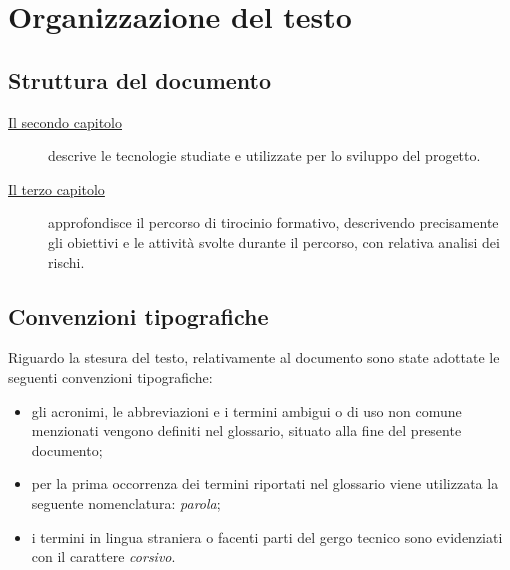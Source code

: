 \section{Organizzazione del testo}

\subsection{Struttura del documento}

\begin{description}
    \item[{\hyperref[cap:tecnologie]{Il secondo capitolo}}] descrive le tecnologie studiate e utilizzate per lo sviluppo del progetto.
    
    \item[{\hyperref[cap:descrizione-stage]{Il terzo capitolo}}] approfondisce il percorso di tirocinio formativo, descrivendo precisamente gli obiettivi e le attività svolte durante il percorso,
    con relativa analisi dei rischi.
    
\end{description}

\subsection{Convenzioni tipografiche}
Riguardo la stesura del testo, relativamente al documento sono state adottate le seguenti convenzioni tipografiche:
\begin{itemize}
	\item gli acronimi, le abbreviazioni e i termini ambigui o di uso non comune menzionati vengono definiti nel glossario, situato alla fine del presente documento;
	\item per la prima occorrenza dei termini riportati nel glossario viene utilizzata la seguente nomenclatura: \emph{parola}\glsfirstoccur;
	\item i termini in lingua straniera o facenti parti del gergo tecnico sono evidenziati con il carattere \emph{corsivo}.
\end{itemize}

